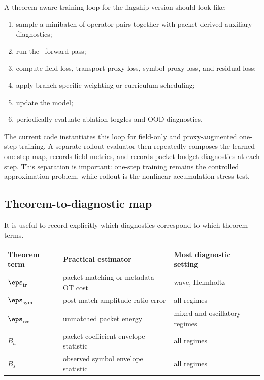 A theorem-aware training loop for the flagship version should look like:
\begin{enumerate}
\item sample a minibatch of operator pairs together with packet-derived auxiliary diagnostics;
\item run the \MiNO\ forward pass;
\item compute field loss, transport proxy loss, symbol proxy loss, and residual loss;
\item apply branch-specific weighting or curriculum scheduling;
\item update the model;
\item periodically evaluate ablation toggles and OOD diagnostics.
\end{enumerate}
The current code instantiates this loop for field-only and proxy-augmented one-step training. A separate rollout evaluator then repeatedly composes the learned one-step map, records field metrics, and records packet-budget diagnostics at each step. This separation is important: one-step training remains the controlled approximation problem, while rollout is the nonlinear accumulation stress test.

\subsection{Theorem-to-diagnostic map}

It is useful to record explicitly which diagnostics correspond to which theorem terms.

\begin{center}
\begin{tabular}{p{}p{}p{}}
\toprule
Theorem term & Practical estimator & Most diagnostic setting \\
\midrule
$\eps_{\mathrm{tr}}$ & packet matching or metadata OT cost & wave, Helmholtz \\
$\eps_{\mathrm{sym}}$ & post-match amplitude ratio error & all regimes \\
$\eps_{\mathrm{res}}$ & unmatched packet energy & mixed and oscillatory regimes \\
$B_a$ & packet coefficient envelope statistic & all regimes \\
$B_s$ & observed symbol envelope statistic & all regimes \\
\bottomrule
\end{tabular}
\end{center}

